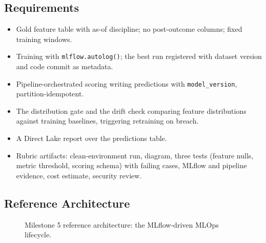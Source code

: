 \subsection*{Requirements}
\begin{itemize}
    \item Gold feature table with as-of discipline; no post-outcome columns; fixed training windows.
    \item Training with \texttt{mlflow.autolog()}; the best run registered with dataset version and code commit as metadata.
    \item Pipeline-orchestrated scoring writing predictions with \texttt{model\_version}, partition-idempotent.
    \item The distribution gate and the drift check comparing feature distributions against training baselines, triggering retraining on breach.
    \item A Direct Lake report over the predictions table.
    \item Rubric artifacts: clean-environment run, diagram, three tests (feature nulls, metric threshold, scoring schema) with failing cases, MLflow and pipeline evidence, cost estimate, security review.
\end{itemize}

\subsection*{Reference Architecture}
\begin{figure}[H]
    \centering
    \caption{Milestone 5 reference architecture: the MLflow-driven MLOps lifecycle.}
    \label{fig:chapter20-capstone-architecture}
\end{figure}

